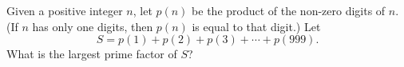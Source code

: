 Given a positive integer $n$, let $p(n)$ be the product of the non-zero digits of $n$.  (If $n$ has only one digits, then $p(n)$ is equal to that digit.)  Let \[ S=p(1)+p(2)+p(3)+\cdots+p(999). \]  What is the largest prime factor of $S$?